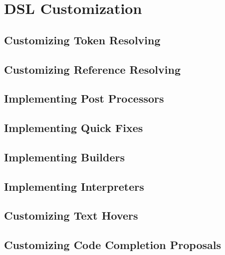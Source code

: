 \chapter{DSL Customization}

\section{Customizing Token Resolving}

\section{Customizing Reference Resolving}

\section{Implementing Post Processors}

\section{Implementing Quick Fixes}

\section{Implementing Builders}

\section{Implementing Interpreters}

\section{Customizing Text Hovers}

\section{Customizing Code Completion Proposals}

